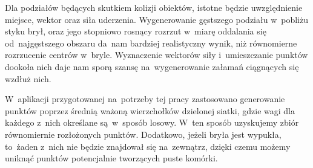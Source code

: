 \documentclass[skorowidz,autorrok,backref,xodstep,oswiadczenie]{wmimgr}
\begin{document}
Dla podziałów będących skutkiem kolizji obiektów, istotne będzie uwzględnienie miejsce, wektor oraz siła uderzenia. Wygenerowanie gęstszego podziału w~pobliżu styku brył, oraz jego stopniowo rosnący rozrzut w~miarę oddalania się od~najgęstszego obszaru da~nam bardziej realistyczny wynik, niż równomierne rozrzucenie centrów w~bryle. Wyznaczenie wektorów siły i~umieszczanie punktów dookoła nich daje nam sporą szansę na~wygenerowanie załamań ciągnących się wzdłuż nich.

W~aplikacji przygotowanej na~potrzeby tej pracy zastosowano generowanie punktów poprzez średnią ważoną wierzchołków dzielonej siatki, gdzie wagi dla każdego z~nich określane są~w~sposób losowy. W~ten sposób uzyskujemy zbiór równomiernie rozłożonych punktów. Dodatkowo, jeżeli bryła jest wypukła, to~żaden z~nich nie będzie znajdował się na~zewnątrz, dzięki czemu możemy uniknąć punktów potencjalnie tworzących puste komórki.

%

\end{document}
